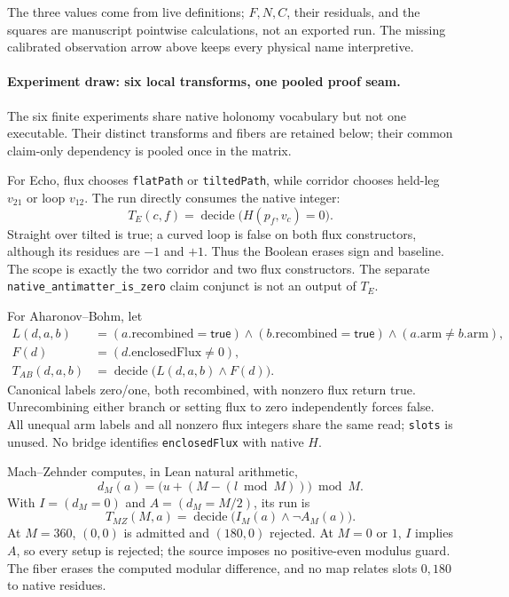 The three values come from live definitions; \(F,N,C\), their residuals, and the squares are manuscript pointwise
calculations, not an exported run.  The missing calibrated observation arrow above keeps every physical name
interpretive.

\paragraph{Experiment draw: six local transforms, one pooled proof seam.}
The six finite experiments share native holonomy vocabulary but not one executable.  Their distinct transforms and
fibers are retained below; their common claim-only dependency is pooled once in the matrix.

For Echo, flux chooses \texttt{flatPath} or \texttt{tiltedPath}, while corridor chooses held-leg \(v_{21}\) or loop
\(v_{12}\).  The run directly consumes the native integer:
\[
 T_E(c,f)=\operatorname{decide}\bigl(H(p_f,v_c)=0\bigr).
\]
Straight over tilted is true; a curved loop is false on both flux constructors, although its residues are \(-1\) and
\(+1\).  Thus the Boolean erases sign and baseline.  The scope is exactly the two corridor and two flux constructors.
The separate \texttt{native\_antimatter\_is\_zero} claim conjunct is not an output of \(T_E\).

For Aharonov--Bohm, let
\[
 \begin{split}
 L(d,a,b)&=(a.\mathrm{recombined}=\mathsf{true})\land
           (b.\mathrm{recombined}=\mathsf{true})\land(a.\mathrm{arm}\ne b.\mathrm{arm}),\\
 F(d)&=(d.\mathrm{enclosedFlux}\ne0),\\
 T_{AB}(d,a,b)&=\operatorname{decide}\bigl(L(d,a,b)\land F(d)\bigr).
 \end{split}
\]
Canonical labels zero/one, both recombined, with nonzero flux return true.  Unrecombining either branch or setting
flux to zero independently forces false.  All unequal arm labels and all nonzero flux integers share the same read;
\texttt{slots} is unused.  No bridge identifies \texttt{enclosedFlux} with native \(H\).

Mach--Zehnder computes, in Lean natural arithmetic,
\[
 d_M(a)=\bigl(u+(M-(l\bmod M))\bigr)\bmod M.
\]
With \(I=(d_M=0)\) and \(A=(d_M=M/2)\), its run is
\[
 T_{MZ}(M,a)=\operatorname{decide}\bigl(I_M(a)\land\neg A_M(a)\bigr).
\]
At \(M=360\), \((0,0)\) is admitted and \((180,0)\) rejected.  At \(M=0\) or \(1\), \(I\) implies \(A\), so every
setup is rejected; the source imposes no positive-even modulus guard.  The fiber erases the computed modular
difference, and no map relates slots \(0,180\) to native residues.

